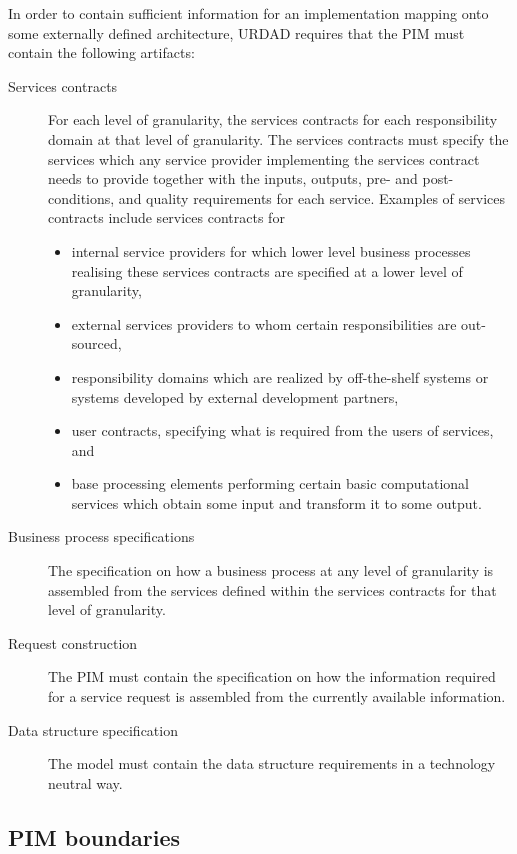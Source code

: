 In order to contain sufficient information for an implementation mapping onto
some externally defined architecture, 
URDAD requires that the PIM must contain the following artifacts:
\begin{description}
  \item[Services contracts] For each level of granularity, the services
 	contracts for each responsibility domain at that level of
	granularity. The services contracts must specify the services which
	any service provider implementing the services contract needs to
	provide together with the inputs, outputs, pre- and post-conditions, and
	quality requirements for each service.
	Examples of services contracts include services contracts for 
	\begin{itemize}
	  \item internal service providers for which lower level
		business processes
		realising these services contracts are specified at a lower
		level of granularity,
	  \item external services providers to whom
		certain responsibilities are out-sourced,
	  \item responsibility domains which are
		realized by off-the-shelf systems or systems developed by
		external development partners,
	  \item user contracts, specifying what is required from the users of
		services, and
	  \item base processing elements performing certain basic computational
		services which obtain some input and transform it to some
		output.
	\end{itemize}

  \item[Business process specifications] The specification on how a business
	process at any level of granularity is assembled from the services
	defined within the services contracts for that level of granularity.	

  \item[Request construction] The PIM must contain the specification on
	how the information required for a service request is assembled
	from the currently available information.

  \item[Data structure specification] The model must contain the data structure
	requirements in a technology neutral way.
\end{description}


\subsection{PIM boundaries}

